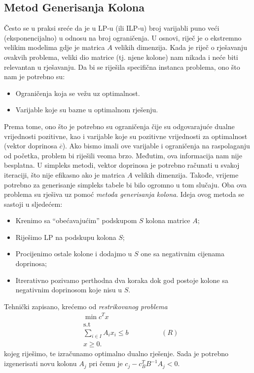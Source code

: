 \documentclass[a4paper, utf8, 11pt, colorlinks]{article}
\begin{document}
\subsection{Metod Generisanja Kolona}%
Često se u praksi sreće da je u LP-u (ili ILP-u) broj varijabli puno veći (eksponencijalno) u odnosu na broj ograničenja. U osnovi, riječ je o ekstremno velikim modelima gdje je matrica $A$ velikih dimenzija. Kada je riječ o rješavanju ovakvih problema, veliki dio matrice (tj. njene kolone) nam nikada i neće biti relevantan u rješavanju. Da bi se riješila specifična instanca problema, ono što nam je potrebno su:
\begin{itemize}
    \item Ograničenja koja se vežu uz optimalnost.
    \item Varijable koje su bazne u optimalnom rješenju.
\end{itemize}
Prema tome, ono što je potrebno su ograničenja čije su odgovarajuće   dualne vrijednosti pozitivne, kao i varijable koje su pozitivne vrijednosti za optimalnost (vektor doprinosa $\overline{c}$). Ako bismo imali ove varijable i ograničenja na raspolaganju od početka, problem bi riješili veoma brzo. Međutim, ova informacija nam nije besplatna.  U simpleks metodi, vektor doprinosa je potrebno računati u svakoj iteraciji, što nije efikasno ako je matrica $A$ velikih dimenzija. Takođe, vrijeme potrebno za generisanje simpleks tabele bi bilo ogromno u tom slučaju.  Oba ova problema su rješiva uz pomoć \emph{metoda generisanja kolona}.  Ideja ovog metoda se sastoji u sljedećem:
\begin{itemize}
    \item Krenimo sa ``obećavajućim'' podskupom $S$ kolona matrice $A$; 
    \item Riješimo LP na podskupu kolona $S$; 
    \item Procijenimo ostale kolone i dodajmo u $S$ one sa negativnim 
          cijenama doprinosa;
    \item Itrerativno pozivamo perthodna dva koraka dok god postoje kolone   sa negativnim doprinosom koje nisu u $S$.
\end{itemize}
Tehnički zapisano, krećemo od \emph{restrikovanog problema}
\begin{align*}
    &\min c^T x \\
    &\mbox{s.t} \\
    & \sum_{i \in I} A_i x_i  \leq b \hspace{2cm} (R)\\
    & x \geq 0. 
\end{align*}
kojeg riješimo, te izračunamo optimalno dualno rješenje. Sada je potrebno izgenerisati novu kolonu $A_j$ pri čemu je $c_j - c_B^T B^{-1}A_j < 0$.
\end{document}
